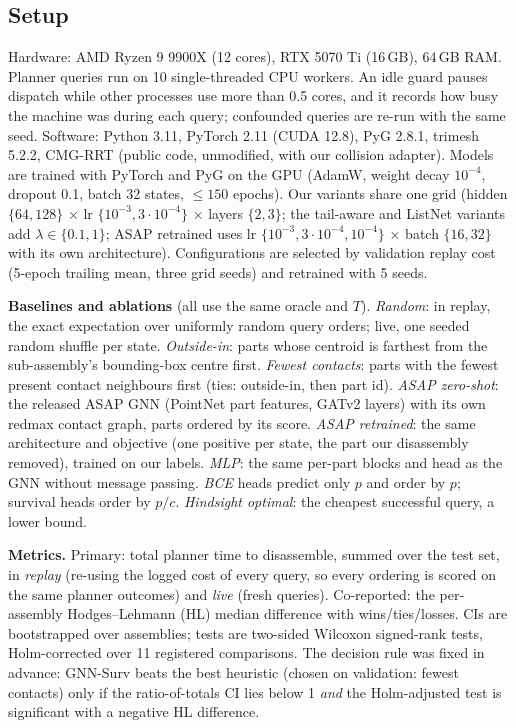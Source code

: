 \documentclass[conference]{IEEEtran}
\begin{document}
\subsection{Setup}
Hardware: AMD Ryzen 9 9900X (12 cores), RTX 5070 Ti (16\,GB), 64\,GB RAM. Planner queries run on 10 single-threaded CPU
workers. An idle guard pauses dispatch while other processes use more than 0.5 cores, and it records how busy the
machine was during each query; confounded queries are re-run with the same seed. Software: Python 3.11, PyTorch 2.11 (CUDA 12.8), PyG 2.8.1, trimesh 5.2.2, CMG-RRT (public code, unmodified,
with our collision adapter). Models are trained with PyTorch and PyG on the GPU (AdamW, weight decay $10^{-4}$, dropout 0.1, batch 32 states, $\le150$ epochs). Our variants share one
grid (hidden $\{64,128\}$ $\times$ lr $\{10^{-3},3\cdot10^{-4}\}$ $\times$ layers $\{2,3\}$; the tail-aware and ListNet
variants add $\lambda\in\{0.1,1\}$; ASAP retrained uses lr $\{10^{-3},3\cdot10^{-4},10^{-4}\}$ $\times$ batch
$\{16,32\}$ with its own architecture). Configurations are selected by validation replay cost (5-epoch trailing mean,
three grid seeds) and retrained with 5 seeds.

\textbf{Baselines and ablations} (all use the same oracle and $T$). \emph{Random}: in replay, the exact expectation over uniformly random query orders; live, one seeded random shuffle
per state. \emph{Outside-in}: parts whose centroid is farthest from the sub-assembly's bounding-box centre
first. \emph{Fewest contacts}: parts with the fewest present contact neighbours first (ties: outside-in, then part id).
\emph{ASAP zero-shot}: the released ASAP GNN (PointNet part features, GATv2 layers) with its own redmax contact graph,
parts ordered by its score. \emph{ASAP retrained}: the same architecture and objective (one positive per state, the
part our disassembly removed), trained on our labels. \emph{MLP}: the same per-part blocks and head as the GNN without
message passing. \emph{BCE} heads predict only $p$ and order by $p$; survival heads order by $p/c$. \emph{Hindsight
optimal}: the cheapest successful query, a lower bound.

\textbf{Metrics.} Primary: total planner time to disassemble, summed over the test set, in \emph{replay} (re-using the
logged cost of every query, so every ordering is scored on the same planner outcomes) and \emph{live} (fresh queries).
Co-reported: the per-assembly Hodges--Lehmann (HL) median difference with wins/ties/losses. CIs are bootstrapped over
assemblies; tests are two-sided Wilcoxon signed-rank tests, Holm-corrected over 11 registered comparisons. The decision
rule was fixed in advance: GNN-Surv beats the best heuristic (chosen on validation: fewest contacts) only if the ratio-of-totals
CI lies below 1 \emph{and} the Holm-adjusted test is significant with a negative HL difference.
\end{document}
